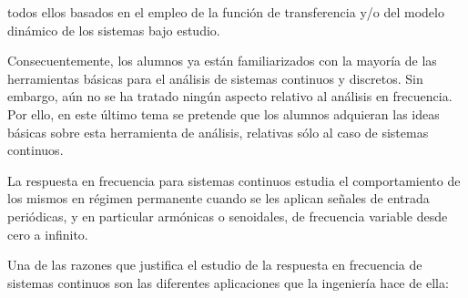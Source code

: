 todos ellos basados en el empleo de la función de transferencia y/o del modelo
dinámico de los sistemas bajo estudio.

Consecuentemente, los alumnos ya están familiarizados con la mayoría de las herramientas
básicas para el análisis de sistemas continuos y discretos. Sin embargo, aún no se ha tratado
ningún aspecto relativo al análisis en frecuencia. Por ello, en este último tema se pretende
que los alumnos adquieran las ideas básicas sobre esta herramienta de análisis, relativas sólo
al caso de sistemas continuos.

\begin{parrafoDestacado}

La respuesta en frecuencia para sistemas continuos estudia el comportamiento de los
mismos en régimen permanente cuando se les aplican señales de entrada periódicas, y en
particular armónicas o senoidales, de frecuencia variable desde cero a infinito.

\end{parrafoDestacado}

Una de las razones que justifica el estudio de la respuesta en frecuencia de sistemas continuos
son las diferentes aplicaciones que la ingeniería hace de ella:

